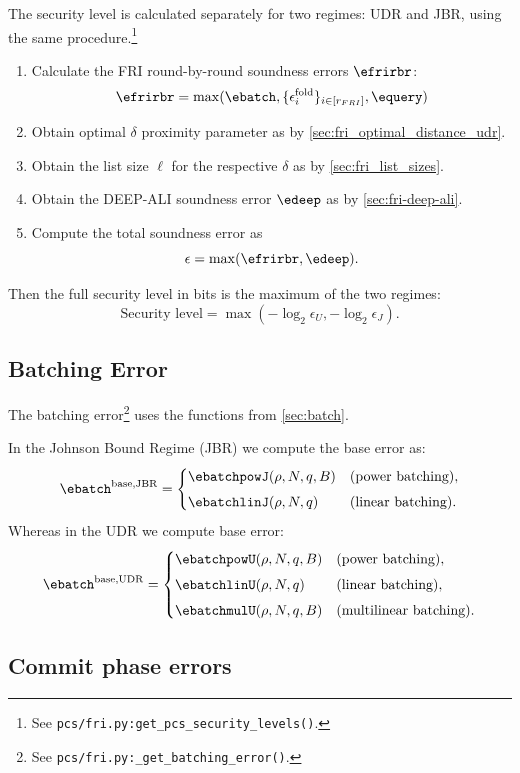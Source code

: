 The security level is calculated separately for two regimes: UDR and JBR, using the same procedure.\footnote{See \texttt{pcs/fri.py:get\_pcs\_security\_levels()}.}
\begin{enumerate}
    \item Calculate the FRI round-by-round soundness errors $\efrirbr $:
    $$
    \efrirbr =\max(\ebatch,  \{\epsilon_{i}^{\mathrm{fold}}\}_{i\in[r_{FRI}]}, \equery)
     $$
    \item Obtain optimal $\delta $ proximity parameter as by   \cref{sec:fri_optimal_distance_udr}.
    \item Obtain the list size $\ell$ for the respective  $\delta $ as  by \cref{sec:fri_list_sizes}.
    \item Obtain the DEEP-ALI soundness error $\edeep$ as by \cref{sec:fri-deep-ali}.
    \item Compute the total soundness error as
     $$
    \epsilon  = \max(\efrirbr, \edeep) .
    $$
\end{enumerate}
Then the  full security level in bits is the maximum of the two regimes:
$$
\text{Security level} = \max(-\log_2 \epsilon_U, -\log_2 \epsilon_J).
$$

\subsection{Batching Error }

The batching error\footnote{See \texttt{pcs/fri.py:\_get\_batching\_error()}.} uses the functions from \cref{sec:batch}.

In the Johnson Bound Regime (JBR) we compute the base error as:
\[
\ebatch^{\text{base,JBR}} =
\begin{cases}
   \ebatchpowJ(\rho,N,q,B) & \text{(power batching)}, \\[4pt]
  \ebatchlinJ(\rho,N,q)& \text{(linear batching)}.
\end{cases}
\]
Whereas in the UDR we compute base error:
\[
\ebatch^{\text{base,UDR}}=
\begin{cases}
   \ebatchpowU(\rho,N,q,B) & \text{(power batching)}, \\[4pt]
  \ebatchlinU(\rho,N,q)& \text{(linear batching)}, \\[4pt]
  \ebatchmulU(\rho,N,q,B)& \text{(multilinear batching)}.
\end{cases}
\]

\subsection{Commit phase errors}

